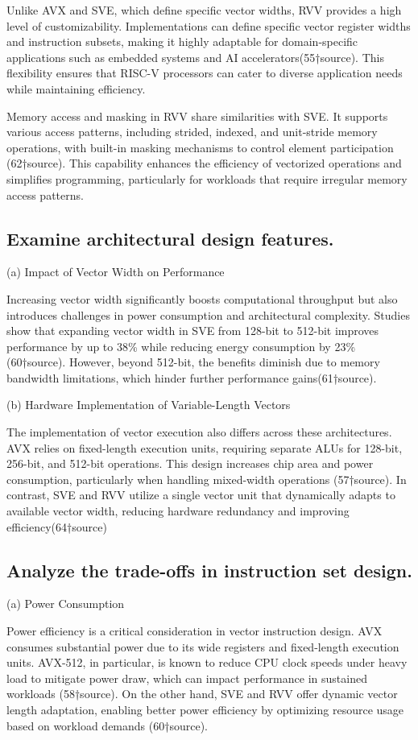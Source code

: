 \documentclass[conference]{IEEEtran}
\begin{document}
Unlike AVX and SVE, which define specific vector widths, RVV provides a high level of customizability. Implementations can define specific vector register widths and instruction subsets, making it highly adaptable for domain-specific applications such as embedded systems and AI accelerators(55†source). This flexibility ensures that RISC-V processors can cater to diverse application needs while maintaining efficiency.

Memory access and masking in RVV share similarities with SVE. It supports various access patterns, including strided, indexed, and unit-stride memory operations, with built-in masking mechanisms to control element participation (62†source). This capability enhances the efficiency of vectorized operations and simplifies programming, particularly for workloads that require irregular memory access patterns.
\subsection{Examine architectural design features.}
(a) Impact of Vector Width on Performance

Increasing vector width significantly boosts computational throughput but also introduces challenges in power consumption and architectural complexity. Studies show that expanding vector width in SVE from 128-bit to 512-bit improves performance by up to 38\% while reducing energy consumption by 23\% (60†source). However, beyond 512-bit, the benefits diminish due to memory bandwidth limitations, which hinder further performance gains(61†source).

(b) Hardware Implementation of Variable-Length Vectors

The implementation of vector execution also differs across these architectures. AVX relies on fixed-length execution units, requiring separate ALUs for 128-bit, 256-bit, and 512-bit operations. This design increases chip area and power consumption, particularly when handling mixed-width operations (57†source). In contrast, SVE and RVV utilize a single vector unit that dynamically adapts to available vector width, reducing hardware redundancy and improving efficiency(64†source)

\subsection{ Analyze the trade-offs in instruction set design.}
(a) Power Consumption

Power efficiency is a critical consideration in vector instruction design. AVX consumes substantial power due to its wide registers and fixed-length execution units. AVX-512, in particular, is known to reduce CPU clock speeds under heavy load to mitigate power draw, which can impact performance in sustained workloads (58†source). On the other hand, SVE and RVV offer dynamic vector length adaptation, enabling better power efficiency by optimizing resource usage based on workload demands (60†source).
\end{document}
